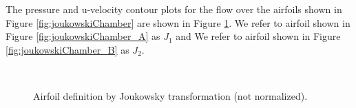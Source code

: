 \documentclass[12pt]{aiaa-pretty}
\begin{document}
The pressure and u-velocity contour plots for the flow over the airfoils shown in Figure \ref{fig:joukowskiChamber} are shown in Figure \ref{fig:flowOverAirfoil}. We refer to airfoil shown in Figure \ref{fig:joukowskiChamber_A} as $J_1$ and We refer to airfoil shown in Figure \ref{fig:joukowskiChamber_B} as $J_2$.

%
	\begin{figure}[H]
		\centering
		\quad
		\\
		\quad
		\caption{Airfoil definition by Joukowsky transformation (not normalized).}
		\label{fig:flowOverAirfoil}
	\end{figure}
%
\end{document}
